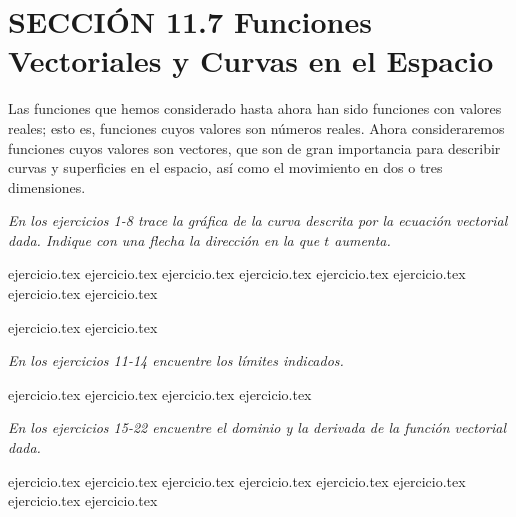 
\section*{SECCIÓN 11.7 \quad Funciones Vectoriales y Curvas en el Espacio}

Las funciones que hemos considerado hasta ahora han sido funciones con valores reales; esto es, funciones cuyos valores son números reales. Ahora consideraremos funciones cuyos valores son vectores, que son de gran importancia para describir curvas y superficies en el espacio, así como el movimiento en dos o tres dimensiones.

\vspace{0.5cm}
\noindent\textit{En los ejercicios 1-8 trace la gráfica de la curva descrita por la ecuación vectorial dada. Indique con una flecha la dirección en la que $t$ aumenta.}

\begin{enumerate}
    {ejercicio.tex}
{ejercicio.tex}
{ejercicio.tex}
{ejercicio.tex}
{ejercicio.tex}
{ejercicio.tex}
{ejercicio.tex}
{ejercicio.tex}
\end{enumerate}

\vspace{0.3cm}
\begin{enumerate}
    \setcounter{enumi}{8}
    {ejercicio.tex}
{ejercicio.tex}
\end{enumerate}

\vspace{0.3cm}
\noindent\textit{En los ejercicios 11-14 encuentre los límites indicados.}

\begin{enumerate}
    \setcounter{enumi}{10}
    {ejercicio.tex}
{ejercicio.tex}
{ejercicio.tex}
{ejercicio.tex}
\end{enumerate}

\vspace{0.3cm}
\noindent\textit{En los ejercicios 15-22 encuentre el dominio y la derivada de la función vectorial dada.}

\begin{enumerate}
    \setcounter{enumi}{14}
    {ejercicio.tex}
{ejercicio.tex}
{ejercicio.tex}
{ejercicio.tex}
{ejercicio.tex}
{ejercicio.tex}
{ejercicio.tex}
{ejercicio.tex}
\end{enumerate}

